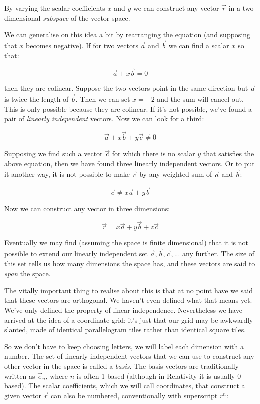 By varying the scalar coefficients $x$ and $y$ we can construct any vector $\vec{r}$ in a two-dimensional \textit{subspace} of the vector space.

We can generalise on this idea a bit by rearranging the equation (and supposing that $x$ becomes negative). If for two vectors $\vec{a}$ and $\vec{b}$ we can find a scalar ${x}$ so that:

$$ 
\vec{a} + x \vec{b} = 0
$$

then they are colinear. Suppose the two vectors point in the same direction but $\vec{a}$ is twice the length of $\vec{b}$. Then we can set $x = -2$ and the sum will cancel out. This is only possible because they are colinear. If it's not possible, we've found a pair of \textit{linearly independent} vectors. Now we can look for a third:

$$ 
\vec{a} + x \vec{b} + y \vec{c} \ne 0
$$

Supposing we find such a vector $\vec{c}$ for which there is no scalar $y$ that satisfies the above equation, then we have found three linearly independent vectors. Or to put it another way, it is not possible to make $\vec{c}$ by any weighted sum of $\vec{a}$ and $\vec{b}$:

$$
\vec{c} \ne x \vec{a} + y \vec{b}
$$

Now we can construct any vector in three dimensions:

$$
\vec{r} = x \vec{a} + y \vec{b} + z \vec{c}
$$

Eventually we may find (assuming the space is finite dimensional) that it is not possible to extend our linearly independent set $\vec{a}, \vec{b}, \vec{c}, ...$ any further. The size of this set tells us how many dimensions the space has, and these vectors are said to \textit{span} the space.

The vitally important thing to realise about this is that at no point have we said that these vectors are orthogonal. We haven't even defined what that means yet. We've only defined the property of linear independence. Nevertheless we have arrived at the idea of a coordinate grid; it's just that our grid may be awkwardly slanted, made of identical parallelogram tiles rather than identical square tiles.

So we don't have to keep choosing letters, we will label each dimension with a number. The set of linearly independent vectors that we can use to construct any other vector in the space is called a \textit{basis}. The basis vectors are traditionally written as $\vec{e}_n$, where $n$ is often 1-based (although in Relativity it is usually 0-based). The scalar coefficients, which we will call coordinates, that construct a given vector $\vec{r}$ can also be numbered, conventionally with superscript $r^n$:

